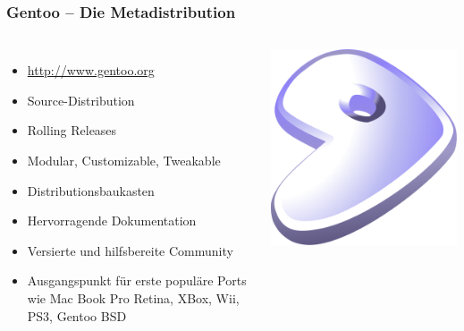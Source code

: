 \documentclass[utf8]{beamer}
\begin{document}
\begin{frame}
  \frametitle{Gentoo -- Die Metadistribution}

  \begin{columns}
        \begin{itemize}
          \item \url{http://www.gentoo.org}
          \item Source-Distribution 
          \item Rolling Releases
          \item Modular, Customizable, Tweakable
          \item Distributionsbaukasten
          \item Hervorragende Dokumentation
          \item Versierte und hilfsbereite Community
          \item Ausgangspunkt für erste populäre Ports wie Mac Book Pro Retina, XBox, Wii, PS3, Gentoo BSD
        \end{itemize}
      \hfill
      \begin{center}\includegraphics[scale=0.25]{Gentoo_logo.png}\end{center}
  \end{columns}

\end{frame}
\end{document}

